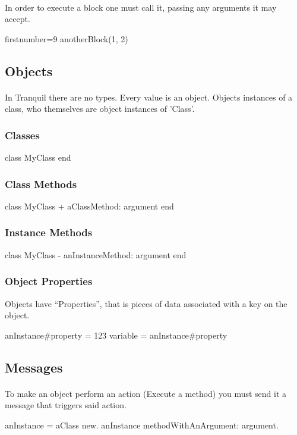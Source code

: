 \documentclass[12pt]{article}
\begin{document}
\paragraph{}
In order to execute a block one must call it, passing any arguments it may accept.

\begin{tranquilcode*}{firstnumber=9}
	anotherBlock(1, 2)
\end{tranquilcode*}

\subsection{Objects}
\paragraph{}
In Tranquil there are no types. Every value is an object. Objects instances of a class, who themselves are object instances of 'Class'.

\subsubsection{Classes}
\begin{tranquilcode}
	class MyClass
	end
\end{tranquilcode}

\subsubsection{Class Methods}
\begin{tranquilcode}
	class MyClass
		+ aClassMethod: argument {
		}
	end
\end{tranquilcode}

\subsubsection{Instance Methods}
\begin{tranquilcode}
	class MyClass
		- anInstanceMethod: argument {
		}
	end
\end{tranquilcode}

\subsubsection{Object Properties}
Objects have ``Properties'', that is pieces of data associated with a key on the object.

\begin{tranquilcode}
	anInstance#property = 123
	variable = anInstance#property
\end{tranquilcode}

\subsection{Messages}
\paragraph{}
To make an object perform an action (Execute a method) you must send it a message that triggers said action.

\begin{tranquilcode}
	anInstance = aClass new.
	anInstance methodWithAnArgument: argument.
\end{tranquilcode}
\end{document}
